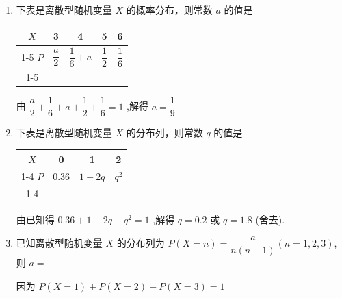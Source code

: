 \begin{enumerate}
\begin{enumerate}
\begin{jieda}
\begin{enumerate}
\begin{center}
                \end{center}
            \end{enumerate}
        \end{jieda}

        
        \item 下表是离散型随机变量 $X$ 的概率分布，则常数 $a$ 的值是
        
        \begin{center}
        
        \begin{tabular}{|c|c|c|c|c|}
        \hline
        $X$ & 3 & 4 & 5 & 6 \\
        \cline{1-5}
        $P$ & $\dfrac{a}{2}$ & $\dfrac{1}{6}+a$ & $\dfrac{1}{2}$ & $\dfrac{1}{6}$ \\
        \cline{1-5}
        \hline
        \end{tabular}
        
        \end{center}
        \begin{jieda}
            由 $\dfrac{a}{2} + \dfrac{1}{6} + a + \dfrac{1}{2} + \dfrac{1}{6} = 1$ ,解得 $a = \dfrac{1}{9}$
        \end{jieda}

        \item 下表是离散型随机变量 $X$ 的分布列，则常数 $q$ 的值是
        
        \begin{center}
        
        \begin{tabular}{|c|c|c|c|}
        \hline
        $X$ & 0 & 1 & 2 \\
        \cline{1-4}
        $P$ & $0.36$ & $1-2q$ & ${q}^{2}$ \\
        \cline{1-4}
        \hline
        \end{tabular}
        \end{center}
        \begin{jieda}
            由已知得 ${0.36} + 1 - {2q} + {q}^{2} = 1$ ,解得 $q = {0.2}$ 或 $q = {1.8}$ (舍去).
        \end{jieda}
        
        \item 已知离散型随机变量 $X$ 的分布列为 $P\left( {X = n}\right)  = \dfrac{a}{n\left( {n + 1}\right) }(n = 1,2,3)$,则 $a =$
        \begin{jieda}
            因为 $P\left( {X = 1}\right)  + P\left( {X = 2}\right)  + P\left( {X = 3}\right)  = 1$
            

\end{jieda}
\end{enumerate}
\end{enumerate}
